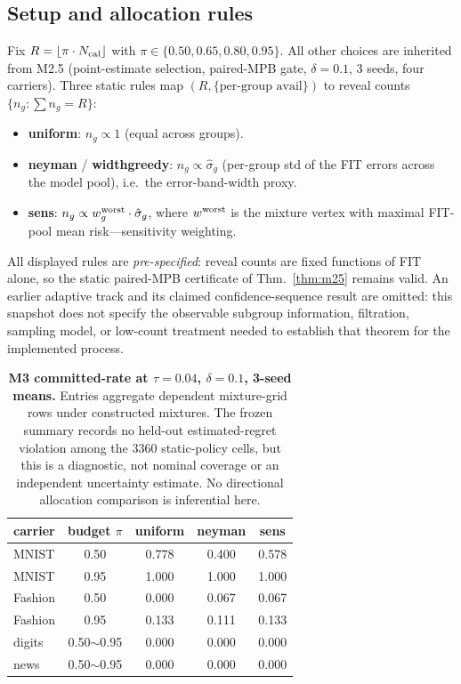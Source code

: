 \documentclass{article}
\begin{document}
\subsection{Setup and allocation rules}
Fix $R=\lfloor \pi \cdot N_{\rm cal}\rfloor$ with $\pi\in\{0.50,0.65,0.80,0.95\}$. All other
choices are inherited from M2.5 (point-estimate selection, paired-MPB gate, $\delta{=}0.1$,
3 seeds, four carriers). Three static rules map $(R,\{\text{per-group avail}\})$ to reveal counts
$\{n_g:\sum n_g=R\}$:
\begin{itemize}
\item \textbf{uniform}: $n_g\propto 1$ (equal across groups).
\item \textbf{neyman} / \textbf{widthgreedy}: $n_g\propto \hat\sigma_g$ (per-group std of the
FIT errors across the model pool), i.e.\ the error-band-width proxy.
\item \textbf{sens}: $n_g\propto w^{\rm worst}_g \cdot \hat\sigma_g$, where $w^{\rm worst}$ is
the mixture vertex with maximal FIT-pool mean risk---sensitivity weighting.
\end{itemize}
All displayed rules are \emph{pre-specified}: reveal counts are fixed functions of FIT alone, so
the static paired-MPB certificate of Thm.~\ref{thm:m25} remains valid. An earlier adaptive
track and its claimed confidence-sequence result are omitted: this snapshot does not specify
the observable subgroup information, filtration, sampling model, or low-count treatment needed
to establish that theorem for the implemented process.

\FloatBarrier
\begin{table}[H]
\centering\small\setlength{\tabcolsep}{5pt}
\begin{tabular}{lcccc}
\toprule
carrier & budget $\pi$ & uniform & neyman & sens \\
\midrule
MNIST & 0.50 & 0.778 & 0.400 & 0.578 \\
MNIST & 0.95 & 1.000 & 1.000 & 1.000 \\
Fashion & 0.50 & 0.000 & 0.067 & 0.067 \\
Fashion & 0.95 & 0.133 & 0.111 & 0.133 \\
digits & 0.50$\sim$0.95 & 0.000 & 0.000 & 0.000 \\
news & 0.50$\sim$0.95 & 0.000 & 0.000 & 0.000 \\
\bottomrule
\end{tabular}
\caption{\textbf{M3 committed-rate at $\tau{=}0.04$, $\delta{=}0.1$, 3-seed means.}
Entries aggregate dependent mixture-grid rows under constructed mixtures. The frozen summary
records no held-out estimated-regret violation among the $3360$ static-policy cells, but this
is a diagnostic, not nominal coverage or an independent uncertainty estimate. No directional
allocation comparison is inferential here.}
\label{tab:m3}
\end{table}
\end{document}
